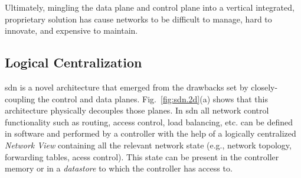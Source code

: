 Ultimately, mingling the data plane and control plane into a vertical integrated, proprietary solution has cause networks to be difficult to manage, hard to innovate, and expensive to maintain. 



\subsection{Logical Centralization} 
\gls{sdn} is a novel architecture that emerged from the drawbacks set by closely-coupling the control and data planes. 
Fig.~\ref{fig:sdn.2d}(a) shows that this architecture  physically decouples those planes. 
In \gls{sdn} all network control functionality  such as routing, access control, load balancing, etc. can be defined in software and performed by a controller with the help of a logically centralized \emph{Network View} containing  all the relevant network state (e.g., network topology, forwarding tables, acess control). 
This state can be present in the controller memory or in  a \emph{datastore}  to which the controller has access to. 



